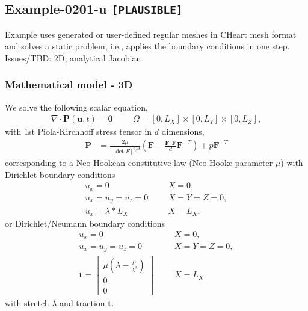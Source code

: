 %
\clearpage
%
\subsection{Example-0201-u \texttt{[PLAUSIBLE]}}
%
Example uses generated or user-defined regular meshes in CHeart mesh format
and solves a static problem, i.e., applies the boundary conditions in one step.\\[3ex]

Issues/TBD: 2D, analytical Jacobian
%
%
\subsubsection{Mathematical model - 3D}
%
We solve the following scalar equation,
%
\begin{align}
    \nabla \cdot \boldsymbol{P} (\boldsymbol{u}, t) = \boldsymbol{0} & &&\Omega = [0, L_X] \times [0, L_Y] \times [0, L_Z],
\end{align}
%
with 1st Piola-Kirchhoff stress tensor in $d$ dimensions,
%
\begin{align}
    \boldsymbol{P} &= \frac{2 \mu}{[\det F]^{2/d}} \left( \boldsymbol{F} - \frac{\boldsymbol{F} : \boldsymbol{F}}{d} \boldsymbol{F}^{-T} \right) + p \boldsymbol{F}^{-T}
\end{align}
%
corresponding to a Neo-Hookean constitutive law (Neo-Hooke parameter $\mu$)
with Dirichlet boundary conditions
%
\begin{align}
    u_x = 0 & &&X = 0, \\
    u_x = u_y = u_z = 0 & && X = Y = Z = 0, \\
		u_x = \lambda * L_X & &&X = L_X.
\end{align}
%
or Dirichlet/Neumann boundary conditions
%
\begin{align}
    u_x = 0 & &&X = 0, \\
    u_x = u_y = u_z = 0 & && X = Y = Z = 0, \\
		\boldsymbol{t} = \begin{bmatrix}
		  \mu (\lambda - \frac{\mu}{\lambda^2}) \\
		  0 \\
		  0
		\end{bmatrix} & &&X = L_X.
\end{align}
%
with stretch $\lambda$ and traction $\boldsymbol{t}$.

